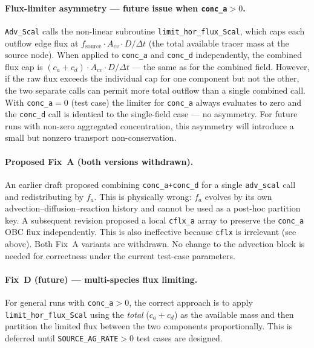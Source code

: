 \documentclass[11pt]{article}
\begin{document}
\paragraph{Flux-limiter asymmetry --- future issue when \texttt{conc\_a}$>0$.}
\texttt{Adv\_Scal} calls the non-linear subroutine
\texttt{limit\_hor\_flux\_Scal}, which caps each outflow edge flux at
$f_\text{source}\cdot A_{cv}\cdot D/\Delta t$ (the total available tracer
mass at the source node).  When applied to \texttt{conc\_a} and \texttt{conc\_d}
independently, the combined flux cap is
$(c_a + c_d)\cdot A_{cv}\cdot D/\Delta t$ --- the same as for the combined
field.  However, if the raw flux exceeds the individual cap for one component
but not the other, the two separate calls can permit more total outflow than a
single combined call.  With \texttt{conc\_a}$=0$ (test case) the limiter for
\texttt{conc\_a} always evaluates to zero and the \texttt{conc\_d} call is
identical to the single-field case --- no asymmetry.  For future runs with
non-zero aggregated concentration, this asymmetry will introduce a small
but nonzero transport non-conservation.

\paragraph{Proposed Fix~A (both versions withdrawn).}
An earlier draft proposed combining \texttt{conc\_a+conc\_d} for a single
\texttt{adv\_scal} call and redistributing by $f_a$.
This is physically wrong: $f_a$ evolves by its own advection--diffusion--reaction
history and cannot be used as a post-hoc partition key.
A subsequent revision proposed a local \texttt{cflx\_a} array to preserve
the \texttt{conc\_a} OBC flux independently.
This is also ineffective because \texttt{cflx} is irrelevant (see above).
Both Fix~A variants are withdrawn.  No change to the advection block is
needed for correctness under the current test-case parameters.

\paragraph{Fix~D (future) --- multi-species flux limiting.}
For general runs with \texttt{conc\_a}$>0$, the correct approach is to apply
\texttt{limit\_hor\_flux\_Scal} using the \emph{total} ($c_a+c_d$) as the
available mass and then partition the limited flux between the two components
proportionally.  This is deferred until \texttt{SOURCE\_AG\_RATE}$>0$ test
cases are designed.
\end{document}
